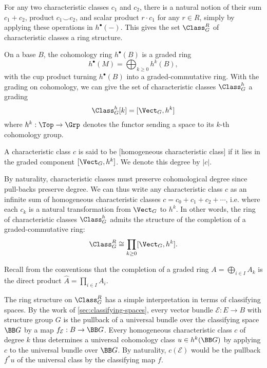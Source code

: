 For any two characteristic classes $c_1$ and $c_2$, there is a natural notion of their sum $c_1+c_2$, product $c_1\smile c_2$, and scalar product $r\cdot c_1$ for any $r\in R$, simply by applying these operations in $h^\bullet(-)$. This gives the set $\Class_G^R$ of characteristic classes a ring structure.

On a base $B$, the cohomology ring $h^\bullet(B)$ is a graded ring
\[
	h^\bullet(M) = \bigoplus_{k\geq 0} h^k(B),
\]
with the cup product turning $h^\bullet(B)$ into a graded-commutative ring.
With the grading on cohomology, we can give the set of characteristic classes $\Class_G^h$ a grading
\[
	\Class_G^h[k] = [\Vect_G, h^k]
\]
where $h^k: \Top \to \Grp$ denotes the functor sending a space to its $k$-th cohomology group.

\begin{definition}
	A characteristic class $c$ is said to be [homogeneous characteristic class] if it lies in the graded component $[\Vect_G, h^k]$. We denote this degree by $|c|$.
\end{definition}

By naturality, characteristic classes must preserve cohomological degree since pull-backs preserve degree. We can thus write any characteristic class $c$ as an infinite sum of homogeneous characteristic classes $c=c_0+c_1+c_2+\cdots$, i.e. where each $c_k$ is a natural transformation from $\Vect_G$ to $h^k$.
In other words, the ring of characteristic classes $\Class_G^h$ admits the structure of the completion of a graded-commutative ring:
\[
	\Class_G^R \cong \prod_{k \geq 0} [\Vect_G, h^k].
\]
\begin{remark}
	Recall from the conventions that the completion of a graded ring $A=\bigoplus_{i\in I} A_k$ is the direct product $\widehat{A}=\prod_{i\in I} A_i$.
\end{remark}

The ring structure on $\Class_G^R$ has a simple interpretation in terms of classifying spaces. By the work of \cref{sec:classifying-spaces}, every vector bundle $\mathcal{E} : E \to B$ with structure group $G$ is the pullback of a universal bundle over the classifying space $\BB G$ by a map $f_{\mathcal{E}} : B \to \BB G$.
Every homogeneous characteristic class $c$ of degree $k$ thus determines a universal cohomology class $u\in h^k(\BB G)$ by applying $c$ to the universal bundle over $\BB G$. By naturality, $c(\mathcal{E})$ would be the pullback $f^*u$ of the universal class by the classifying map $f$.

